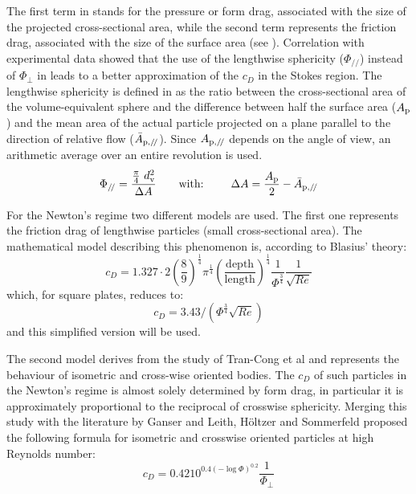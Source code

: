 		The first term in  stands for the pressure or form drag, associated with the size of the projected cross-sectional area, while the second term represents the friction drag, associated with the size of the surface area (see ). Correlation with experimental data showed that the use of the lengthwise sphericity ($ \Phi_{/\!/} $) instead of $ \Phi_{\perp} $ in  leads to a better approximation of the $ c_D $ in the Stokes region. 
		The lengthwise sphericity is defined in  as the ratio between the cross-sectional area of the volume-equivalent sphere and the difference between half the surface area ($ A_{\textup{p}} $) and the mean area of the actual particle projected on a plane parallel to the direction of relative flow ($ \bar{A}_{\textup{p},/\!/} $). Since $ A_{\textup{p},/\!/} $ depends on the angle of view, an arithmetic average over an entire revolution is used.
		\begin{equation}
			\Phi_{/\!/} = \dfrac{\frac{\pi}{4}\ d_{\textup{v}}^2} {\Delta A} \qquad \text{with: } \qquad \Delta A = \dfrac{A_{\textup{p}}}{2} - \bar{A}_{\textup{p},/\!/}
			\label{eq: Lengthwise}
		\end{equation}

		For the Newton's regime two different models are used. The first one represents the friction drag of lengthwise particles (small cross-sectional area). The mathematical model describing this phenomenon is, according to Blasius' theory:
		\begin{equation}
			c_D = 1.327 \cdot 2 \left(\frac{8}{9}\right)^{\frac{1}{4}} \pi^{\frac{1}{4}} \left(\frac{\text{depth}}{\text{length}}\right)^{\frac{1}{4}} \frac{1}{\Phi^{\frac{3}{4}}} \frac{1}{\sqrt{Re}}
			\label{eq: Blasius}
		\end{equation}
		which, for square plates, reduces to:
		\begin{equation}
			c_D = 3.43 / (\Phi^{\frac{3}{4}} \sqrt{Re})
			\label{eq: SimpleBlasius}
		\end{equation}
		and this simplified version will be used.
		
		The second model derives from the study of Tran-Cong et al \cite{TranCongEtAl-2004} and represents the behaviour of isometric and cross-wise oriented bodies. The $ c_D $ of such particles in the Newton's regime is almost solely determined by form drag, in particular it is approximately proportional to the reciprocal of crosswise sphericity. Merging this study with the literature by Ganser and Leith, H\"{o}ltzer and Sommerfeld proposed the following formula for isometric and crosswise oriented particles at high Reynolds number:
		\begin{equation}
			c_D = 0.4210^{0.4(-\log \Phi)^{0.2}} \frac{1}{\Phi_{\perp}}
			\label{eq: TranCong}
		\end{equation}


